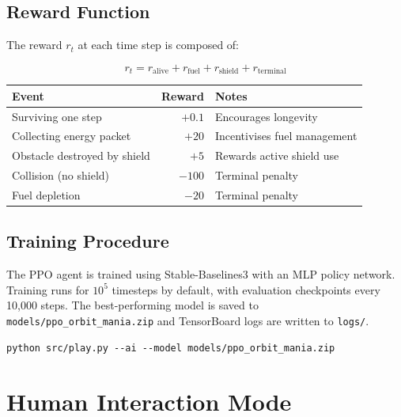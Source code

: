 \documentclass[12pt]{article}
\begin{document}
\subsection{Reward Function}

The reward $r_t$ at each time step is composed of:

\begin{equation}
    r_t = r_{\text{alive}} + r_{\text{fuel}} + r_{\text{shield}} + r_{\text{terminal}}
\end{equation}

\begin{center}
    \renewcommand{\arraystretch}{1.3}
    \begin{tabular}{lrl}
        \toprule
        Event                        & Reward & Notes                        \\
        \midrule
        Surviving one step           & $+0.1$ & Encourages longevity         \\
        Collecting energy packet     & $+20$  & Incentivises fuel management \\
        Obstacle destroyed by shield & $+5$   & Rewards active shield use    \\
        Collision (no shield)        & $-100$ & Terminal penalty             \\
        Fuel depletion               & $-20$  & Terminal penalty             \\
        \bottomrule
    \end{tabular}
\end{center}

\subsection{Training Procedure}

The PPO agent is trained using Stable-Baselines3 with an MLP policy network. Training runs for $10^5$ timesteps by default, with evaluation checkpoints every 10,000 steps. The best-performing model is saved to \texttt{models/ppo\_orbit\_mania.zip} and TensorBoard logs are written to \texttt{logs/}.

\begin{lstlisting}[style=python, caption={Launching the AI agent in human-observable mode.}]
python src/play.py --ai --model models/ppo_orbit_mania.zip
\end{lstlisting}

\section{Human Interaction Mode}
\end{document}
